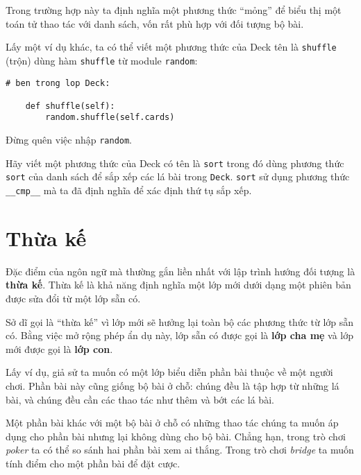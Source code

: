 \documentclass[11pt]{book}
\begin{document}
Trong trường hợp này ta định nghĩa một phương thức ``mỏng'' để biểu thị
một toán tử thao tác với danh sách, vốn rất phù hợp với đối tượng bộ bài.

Lấy một ví dụ khác, ta có thể viết một phương thức của Deck tên là {\tt shuffle} (trộn)
dùng hàm {\tt shuffle} từ module {\tt random}:


\beforeverb
\begin{verbatim}
# ben trong lop Deck:
            
    def shuffle(self):
        random.shuffle(self.cards)
\end{verbatim}
\afterverb
%
Đừng quên việc nhập {\tt random}.

\begin{ex}

Hãy viết một phương thức của Deck có tên là {\tt sort} trong đó dùng
phương thức {\tt sort} của danh sách để sắp xếp các lá bài trong {\tt Deck}.  {\tt sort} sử dụng
phương thức \verb"__cmp__" mà ta đã định nghĩa để xác định thứ tụ sắp xếp.
\end{ex}



\section{Thừa kế}


Đặc điểm của ngôn ngữ mà thường gắn liền nhất với lập trình 
hướng đối tượng là {\bf thừa kế}.  Thừa kế là khả năng 
định nghĩa một lớp mới dưới dạng một phiên bản được sửa đổi
từ một lớp sẵn có.


Sở dĩ gọi là ``thừa kế'' vì lớp mới sẽ hưởng lại toàn bộ các phương thức
từ lớp sẵn có. Bằng việc mở rộng phép ẩn dụ này, lớp sẵn có được gọi
là {\bf lớp cha mẹ} và lớp mới được gọi là 
{\bf lớp con}.

Lấy ví dụ, giả sử ta muốn có một lớp biểu diễn phần bài thuộc về
một người chơi.  Phần bài này cũng giống bộ bài ở chỗ: chúng đều là
tập hợp từ những lá bài, và chúng đều cần các thao tác như
thêm và bớt các lá bài.

Một phần bài khác với một bộ bài ở chỗ có những thao tác chúng ta 
muốn áp dụng cho phần bài nhưng lại không dùng cho bộ bài. Chẳng hạn,
trong trò chơi {\em poker} ta có thể so sánh hai phần bài xem ai thắng.
Trong trò chơi {\em bridge} ta muốn tính điểm cho một phần bài để 
đặt cược.
\end{document}
